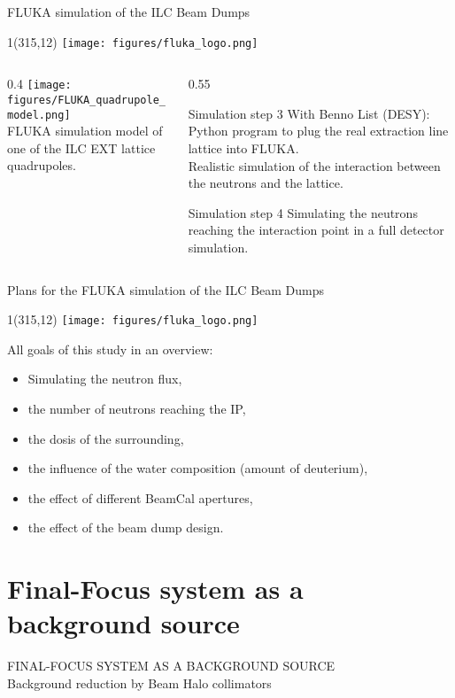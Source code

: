 \documentclass[xcolor={dvipsnames}]{beamer}
\newcommand{\flukalogo}{
  \setlength{\TPHorizModule}{1pt}
  \setlength{\TPVertModule}{1pt}
  \begin{textblock}{1}(315,12)
   \texttt{[image: figures/fluka\_logo.png]}
  \end{textblock}
}
\begin{document}
{\begin{frame}{FLUKA simulation of the ILC Beam Dumps}
\flukalogo
\begin{columns}
\begin{column}[c]{0.4\textwidth}
\texttt{[image: figures/FLUKA\_quadrupole\_model.png]}\\
\small FLUKA simulation model of one of the ILC EXT lattice quadrupoles.
\end{column}
\begin{column}[c]{0.55\textwidth}
\begin{block}{Simulation step 3}
With Benno List (DESY): Python program to plug the real extraction line lattice into FLUKA.\\
Realistic simulation of the interaction between the neutrons and the lattice.
\end{block}
\begin{block}{Simulation step 4}
Simulating the neutrons reaching the interaction point in a full detector simulation.
\end{block}
\end{column}
\end{columns}
\end{frame}

\begin{frame}{Plans for the FLUKA simulation of the ILC Beam Dumps}
 \flukalogo
 All goals of this study in an overview:
\begin{itemize}
 \item Simulating the neutron flux,
 \item the number of neutrons reaching the IP,
 \item the dosis of the surrounding,
 \item the influence of the water composition (amount of deuterium),
 \item the effect of different BeamCal apertures,
 \item the effect of the beam dump design.
\end{itemize}
\end{frame}
}

\section{Final-Focus system as a background source}
\begin{frame}
 \begin{center}
  \alert{\MakeUppercase{Final-Focus system as a background source}\\ \vspace*{0.5cm} Background reduction by Beam Halo collimators}
 \end{center}
\end{frame}
\end{document}
